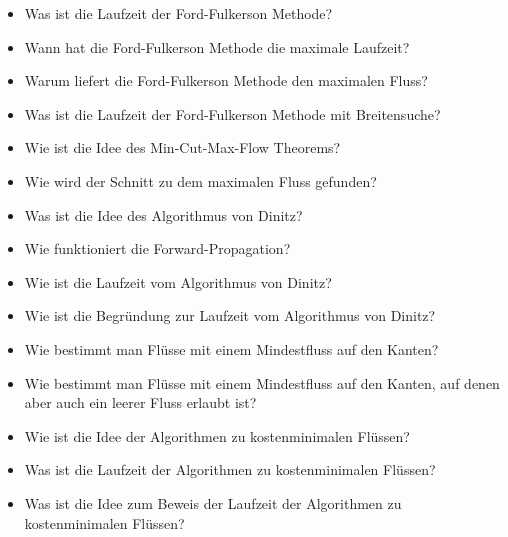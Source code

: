 \documentclass{panikzettel}
\begin{document}
\begin{itemize}
    \item Was ist die Laufzeit der Ford-Fulkerson Methode?
    \item Wann hat die Ford-Fulkerson Methode die maximale Laufzeit?
    \item Warum liefert die Ford-Fulkerson Methode den maximalen Fluss?
    \item Was ist die Laufzeit der Ford-Fulkerson Methode mit Breitensuche?
    \item Wie ist die Idee des Min-Cut-Max-Flow Theorems?
    \item Wie wird der Schnitt zu dem maximalen Fluss gefunden?
    \item Was ist die Idee des Algorithmus von Dinitz?
    \item Wie funktioniert die Forward-Propagation?
    \item Wie ist die Laufzeit vom Algorithmus von Dinitz?
    \item Wie ist die Begründung zur Laufzeit vom Algorithmus von Dinitz?
    \item Wie bestimmt man Flüsse mit einem Mindestfluss auf den Kanten?
    \item Wie bestimmt man Flüsse mit einem Mindestfluss auf den Kanten, auf denen aber auch ein leerer Fluss erlaubt ist?
    \item Wie ist die Idee der Algorithmen zu kostenminimalen Flüssen?
    \item Was ist die Laufzeit der Algorithmen zu kostenminimalen Flüssen?
    \item Was ist die Idee zum Beweis der Laufzeit der Algorithmen zu kostenminimalen Flüssen?
\end{itemize}
\end{document}
